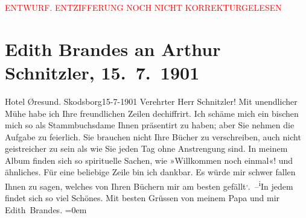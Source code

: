 
\begin{center}
            \textcolor{red}{ENTWURF. ENTZIFFERUNG NOCH NICHT KORREKTURGELESEN}
                      \end{center}
            
               \section[Edith Brandes an Arthur Schnitzler, 15. 7. 1901]{ Edith Brandes an Arthur Schnitzler, 15. 7. 1901}\nopagebreak{}\rehead{ }\begin{ledgroupsized}[t]{13cm}\normalsize\beginnumbering{} \toendnotes[C]{\smallbreak\pagebreak[2]} 
\toendnotes[C]{\smallbreak}\pstart
           \raggedleft{}{\pb}Hotel Øresund. Skodsborg15-7-1901\pend
           \pstart\center{}Verehrter Herr Schnitzler!\pend\pstart
           Mit unendlicher Mühe habe ich Ihre freundlichen Zeilen dechiffrirt. Ich schäme
                    mich ein bischen mich so als Stammbuchsdame Ihnen präsentirt zu haben; aber Sie
                    nehmen die Aufgabe {\pb}zu
                    feierlich. Sie brauchen nicht Ihre Bücher zu verschreiben, auch nicht
                    geistreicher zu sein als wie Sie jeden Tag ohne Anstrengung sind. In meinem
                    Album finden sich so spirituelle Sachen, wie »Willkommen noch einmal«! und
                    ähnliches. Für eine beliebige Zeile bin ich dankbar. Es würde mir schwer fallen
                    Ihnen zu sagen, welches von Ihren Büchern mir am besten gefällt\substVorne{}\textsuperscript{,}\substDazwischen{}. –\substHinten{}{ }\substVorne{}\textsuperscript{i}\substDazwischen{}I\substHinten{}n jedem findet sich so viel Schönes.\pend
           \pstart
           {\pb}Mit besten Grüssen von
                    meinem Papa und mir{\\[\baselineskip]}\spacefill\mbox{Edith Brandes.}\pend
           \leftskip=0em{}\endnumbering{}\end{ledgroupsized}  \newcommand{\dateiname}{L01147}\newcommand{\titel}{Edith Brandes an Arthur Schnitzler, 15. 7. 1901}\newcommand{\editorInnen}{Martin Anton Müller und Gerd-Hermann Susen}
      